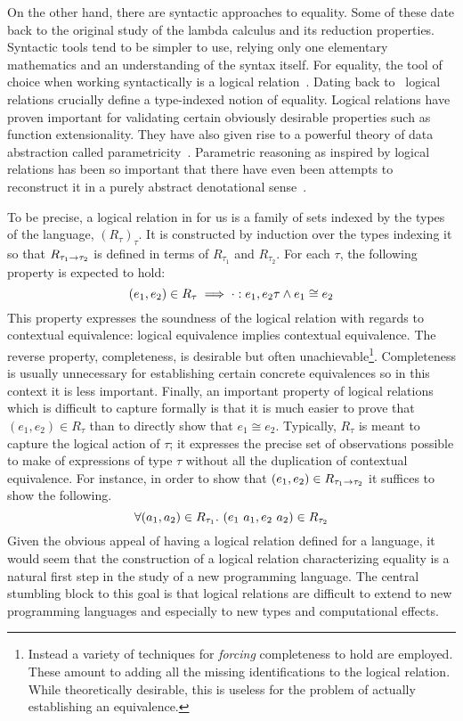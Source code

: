 On the other hand, there are syntactic approaches to equality. Some of
these date back to the original study of the lambda calculus and its
reduction properties. Syntactic tools tend to be simpler to use,
relying only one elementary mathematics and an understanding of the
syntax itself. For equality, the tool of choice when working
syntactically is a logical
relation~\citep{Tait:67,Girard:72,Pitts:98,Appel:01,Ahmed:04,Ahmed:06,Appel:07,Dreyer:09,Dreyer:10}.
Dating back to~\citet{Tait:67} logical relations crucially define a
type-indexed notion of equality. Logical relations have proven
important for validating certain obviously desirable properties such
as function extensionality. They have also given rise to a powerful
theory of data abstraction called
parametricity~\citep{Reynolds:83}. Parametric reasoning as inspired
by logical relations has been so important that there have even been
attempts to reconstruct it in a purely abstract denotational
sense~\citep{Bainbridge:90,Ma:91,Birkedal:05,Dunphy:04}.

To be precise, a logical relation in for us is a family of sets
indexed by the types of the language, $(R_\tau)_\tau$. It is
constructed by induction over the types indexing it so that
$R_{\tau_1 \to \tau_2}$ is defined in terms of $R_{\tau_1}$ and
$R_{\tau_2}$. For each $\tau$, the following property is expected to
hold:
\[
  (e_1, e_2) \in R_\tau \implies
  \cdot \mathrel{:} e_1, e_2{\tau} \land e_1 \cong e_2
\]
This property expresses the soundness of the logical relation with
regards to contextual equivalence: logical equivalence implies
contextual equivalence. The reverse property, completeness, is
desirable but often unachievable\footnote{Instead a variety of
  techniques for \emph{forcing} completeness to hold are
  employed. These amount to adding all the missing identifications to
  the logical relation. While theoretically desirable, this is useless
  for the problem of actually establishing an
  equivalence.}. Completeness is usually unnecessary for establishing
certain concrete equivalences so in this context it is less
important. Finally, an important property of logical relations which
is difficult to capture formally is that it is much easier to prove
that $(e_1, e_2) \in R_\tau$ than to directly show that
$e_1 \cong e_2$. Typically, $R_\tau$ is meant to capture the logical
action of $\tau$; it expresses the precise set of observations
possible to make of expressions of type $\tau$ without all the
duplication of contextual equivalence. For instance, in order to show
that $(e_1, e_2) \in R_{\tau_1 \to \tau_2}$ it suffices to show the
following.
\[
  \forall (a_1, a_2) \in R_{\tau_1}.
  \ (e_1\ a_1, e_2\ a_2) \in R_{\tau_2}
\]
Given the obvious appeal of having a logical relation defined for a
language, it would seem that the construction of a logical relation
characterizing equality is a natural first step in the study of a new
programming language. The central stumbling block to this goal is that
logical relations are difficult to extend to new programming languages
and especially to new types and computational effects.

